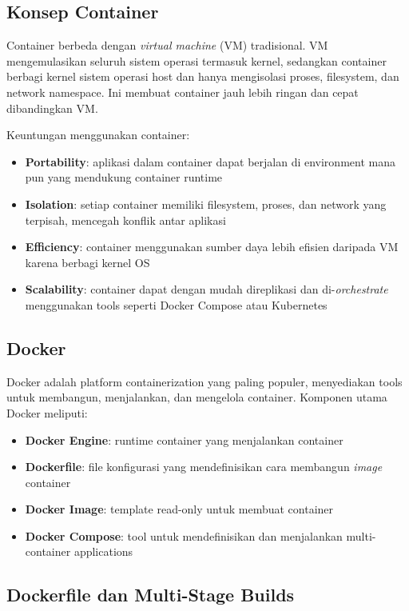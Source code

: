 \subsection{Konsep Container}

Container berbeda dengan \textit{virtual machine} (VM) tradisional. VM
mengemulasikan seluruh sistem operasi termasuk kernel, sedangkan container
berbagi kernel sistem operasi host dan hanya mengisolasi proses, filesystem,
dan network namespace. Ini membuat container jauh lebih ringan dan cepat
dibandingkan VM.

Keuntungan menggunakan container:
\begin{itemize}
    \item \textbf{Portability}: aplikasi dalam container dapat berjalan di
    environment mana pun yang mendukung container runtime
    \item \textbf{Isolation}: setiap container memiliki filesystem, proses, dan
    network yang terpisah, mencegah konflik antar aplikasi
    \item \textbf{Efficiency}: container menggunakan sumber daya lebih efisien
daripada VM karena berbagi kernel OS
    \item \textbf{Scalability}: container dapat dengan mudah direplikasi dan
di-\textit{orchestrate} menggunakan tools seperti Docker Compose atau Kubernetes
\end{itemize}

\subsection{Docker}

Docker adalah platform containerization yang paling populer, menyediakan tools
untuk membangun, menjalankan, dan mengelola container. Komponen utama Docker
meliputi:

\begin{itemize}
    \item \textbf{Docker Engine}: runtime container yang menjalankan container
    \item \textbf{Dockerfile}: file konfigurasi yang mendefinisikan cara membangun
    \textit{image} container
    \item \textbf{Docker Image}: template read-only untuk membuat container
    \item \textbf{Docker Compose}: tool untuk mendefinisikan dan menjalankan
    multi-container applications
\end{itemize}

\subsection{Dockerfile dan Multi-Stage Builds}

